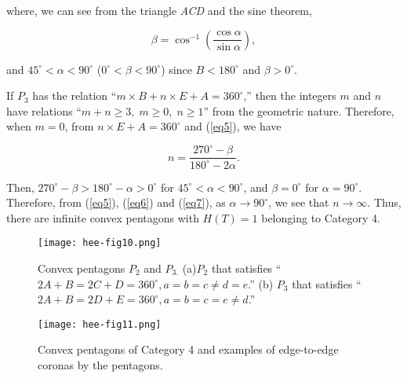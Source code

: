 \documentclass[11pt, a4paper]{article}
\begin{document}
\noindent
where, we can see from the triangle \textit{ACD} and the sine theorem, 


\begin{equation}
\label{eq6}
\beta = \cos ^{ - 1}\left( {\frac{\cos \alpha }{\sin \alpha }} \right),
\end{equation}





\noindent
and $45^ \circ < \alpha < 90^ \circ $ ($0^ \circ < \beta < 90^ \circ $) 
since $B < 180^ \circ $ and $\beta > 0^ \circ $.

If $P_{3}$ has the relation ``$m\times B + n\times E + A = 360^ \circ $,'' 
then the integers $m$ and $n$ have relations ``$m + n \ge 3,\; m \ge 0,\;n \ge 1$'' 
from the geometric nature. Therefore, when $m = 0$, from $n\times E + A = 360^ \circ $ 
and (\ref{eq5}), we have


\begin{equation}
\label{eq7}
n = \frac{270^ \circ - \beta }{180^ \circ - 2\alpha }.
\end{equation}


\noindent
Then, $270^ \circ - \beta > 180^ \circ - \alpha > 0^ \circ $ for 
$45^ \circ < \alpha < 90^ \circ $, and $\beta = 0^ \circ $ for $\alpha = 90^ \circ $. 
Therefore, from (\ref{eq5}), (\ref{eq6}) and (\ref{eq7}), as $\alpha \to 90^ \circ $, 
we see that $n \to \infty $. Thus, there are infinite convex pentagons with $H(T) = 1$ 
belonging to Category 4.




\renewcommand{\figurename}{{\small Figure.}}
\begin{figure}[htbp]
 \centering\texttt{[image: hee-fig10.png]} 
  \caption{{\small 
Convex pentagons $P_{2}$ and $P_{3.}$ (a)$ P_{2}$ that satisfies 
``$2A+B = 2C+D = 360^ \circ, a = b = c \ne d = e$.'' (b) $P_{3}$ that satisfies 
``$2A+B = 2D+E = 360^ \circ, a = b = c = e \ne d$.''
} 
\label{fig10}
}
\end{figure}




\renewcommand{\figurename}{{\small Figure.}}
\begin{figure}[htbp]
 \centering\texttt{[image: hee-fig11.png]} 
  \caption{{\small 
Convex pentagons of Category 4 and examples of edge-to-edge coronas 
by the pentagons.
} 
\label{fig11}
}
\end{figure}
\end{document}
